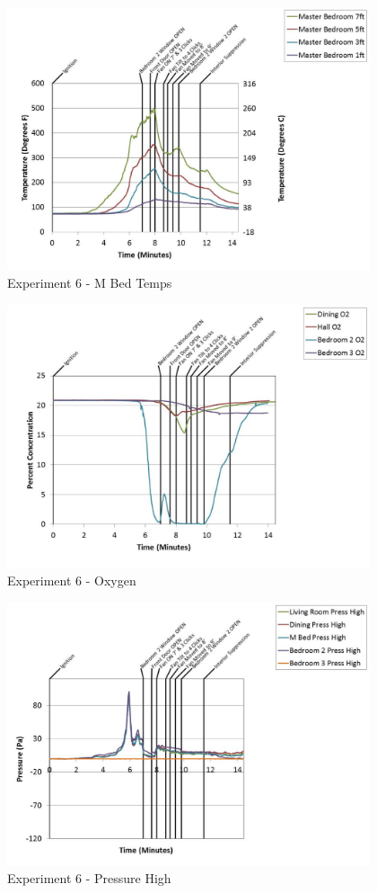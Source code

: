 \documentclass{article}
\begin{document}
\begin{appendices}
	\clearpage

	\begin{figure}[h!]
		\centering
		\includegraphics[height=3.05in]{0_Images/Results_Charts/Exp_6_Charts/MBedTemps.pdf}
		\caption{Experiment 6 - M Bed Temps}
	\end{figure}
 

	\begin{figure}[h!]
		\centering
		\includegraphics[height=3.05in]{0_Images/Results_Charts/Exp_6_Charts/Oxygen.pdf}
		\caption{Experiment 6 - Oxygen}
	\end{figure}
 
	\clearpage

	\begin{figure}[h!]
		\centering
		\includegraphics[height=3.05in]{0_Images/Results_Charts/Exp_6_Charts/PressureHigh.pdf}
		\caption{Experiment 6 - Pressure High}
	\end{figure}
 


\end{appendices}
\end{document}

